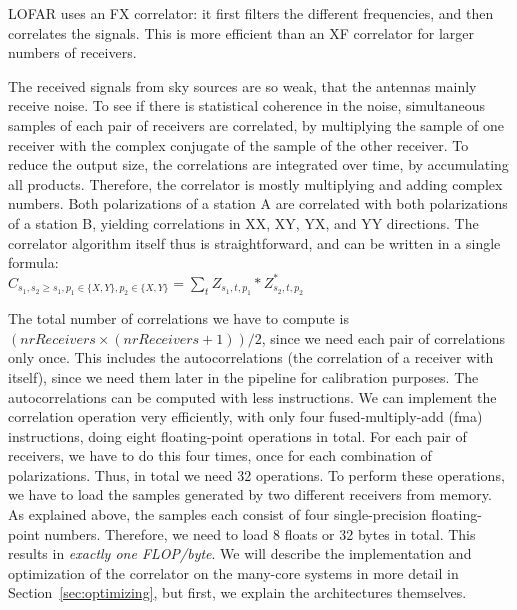 \documentclass{article}
\newcommand{\longversion}[1]{}
\begin{document}
LOFAR uses an FX correlator: it first filters the different frequencies, and
then correlates the signals. This is more efficient than an XF correlator for larger numbers of receivers.
\longversion{
Prior to correlation, the data that comes from
the receivers must be reordered:
each input carries the signals of many frequency bands from a single
receiver, but the correlator needs data from a single frequency of all inputs.
Depending on the data rate, switching the data can be a real challenge.
The data reordering phase is outside the scope of this paper, but a correlator
implementation cannot ignore this issue.
The LOFAR Blue Gene/P correlator uses the fast 3D~torus for this purpose;
other multi-core architectures need external switches.
}
The received signals from sky sources are so weak, that the antennas 
mainly receive noise. To see if there is statistical coherence
in the noise, simultaneous samples of each pair of receivers are correlated, 
by multiplying the sample of one receiver with the complex
conjugate of the sample of the other receiver.
To reduce the output size, the correlations are integrated over time, by accumulating all products. 
Therefore, the correlator is mostly multiplying and adding complex numbers.
Both polarizations of a station A are correlated with both polarizations 
of a station B, yielding correlations in XX, XY, YX, and YY
directions.
The correlator algorithm itself thus is straightforward, and can be
written in a single formula: \\
$C_{s_1,s_2\geq s_1,p_1\in\{X,Y\},p_2\in\{X,Y\}} = \displaystyle\sum_{t} Z_{s_1,t,p_1} * Z_{s_2,t,p_2}^\ast$ 

The total number of correlations we have to compute is $(nrReceivers \times
(nrReceivers + 1)) / 2$, since we need each pair of correlations only
once. This includes the autocorrelations (the correlation of a receiver with itself),
since we need them later in the pipeline for calibration purposes.
The autocorrelations can be computed with less instructions.
We can implement the correlation operation very efficiently, with only
four fused-multiply-add (fma) instructions, doing eight floating-point
operations in total. For each pair of receivers, we have to do this
four times, once for each combination of polarizations. Thus, in total
we need 32 operations. To perform these operations, we have to load
the samples generated by two different receivers from memory.  As
explained above, the samples each consist of four single-precision
floating-point numbers.  Therefore, we need to load 8 floats or 32 bytes in
total.  This results in \emph{exactly one FLOP/byte}. 
We will describe the implementation and optimization of the correlator on the
many-core systems in more detail in Section~\ref{sec:optimizing}, but first, we explain the architectures themselves. 
\end{document}
